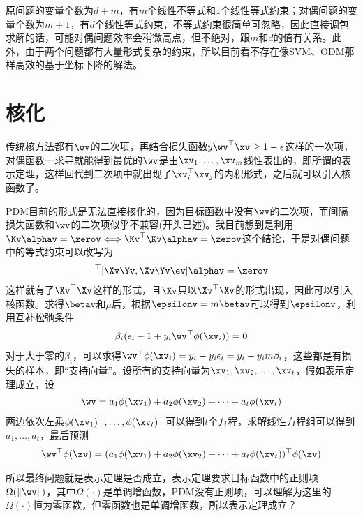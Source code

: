 \documentclass{ctexart}
\begin{document}
原问题的变量个数为$d + m$，有$m$个线性不等式和$1$个线性等式约束；对偶问题的变量个数为$m+1$，有$d$个线性等式约束，不等式约束很简单可忽略，因此直接调包求解的话，可能对偶问题效率会稍微高点，但不绝对，跟$m$和$d$的值有关系。此外，由于两个问题都有大量形式复杂的约束，所以目前看不存在像SVM、ODM那样高效的基于坐标下降的解法。

\section{核化}

传统核方法都有$\wv$的二次项，再结合损失函数$y \wv^\top \xv \ge 1 - \epsilon$这样的一次项，对偶函数一求导就能得到最优的$\wv$是由$\xv_1, \ldots, \xv_m$线性表出的，即所谓的表示定理，这样回代到二次项中就出现了$\xv_i^\top \xv_j$的内积形式，之后就可以引入核函数了。

PDM目前的形式是无法直接核化的，因为目标函数中没有$\wv$的二次项，而间隔损失函数和$\wv$的二次项似乎不兼容(开头已述)。我目前想到是利用$\Kv \alphav = \zerov \Longleftrightarrow \Kv^\top\Kv \alphav = \zerov$这个结论，于是对偶问题中的等式约束可以改写为
\begin{align*}
    [\Xv \Yv, \Xv \Yv \ev]^\top [\Xv \Yv, \Xv \Yv \ev] \alphav = \zerov
\end{align*}
这样就有了$\Xv^\top \Xv$这样的形式，且$\Xv$只以$\Xv^\top \Xv$的形式出现，因此可以引入核函数。求得$\betav$和$\mu$后，根据$\epsilonv = m \betav$可以得到$\epsilonv$，利用互补松弛条件
\begin{align*}
    \beta_i (\epsilon_i - 1 + y_i \wv^\top \phi(\xv_i)) = 0
\end{align*}
对于大于零的$\beta_i$，可以求得$\wv^\top \phi(\xv_i) = y_i - y_i \epsilon_i = y_i - y_i m \beta_i$，这些都是有损失的样本，即“支持向量”。设所有的支持向量为$\xv_1, \xv_2, \ldots, \xv_t$，假如表示定理成立，设
\begin{align} \label{eq: span}
    \wv = a_1 \phi(\xv_1) + a_2 \phi(\xv_2) + \cdots + a_t \phi(\xv_t)
\end{align}
两边依次左乘$\phi(\xv_1)^\top, \ldots, \phi(\xv_t)^\top$可以得到$t$个方程，求解线性方程组可以得到$a_1, \ldots, a_t$，最后预测
\begin{align*}
    \wv^\top \phi(\zv) = (a_1 \phi(\xv_1) + a_2 \phi(\xv_2) + \cdots + a_t \phi(\xv_t))^\top \phi(\zv)
\end{align*}

所以最终问题就是表示定理是否成立，表示定理要求目标函数中的正则项$\Omega(\| \wv \|)$，其中$\Omega(\cdot)$是单调增函数，PDM没有正则项，可以理解为这里的$\Omega(\cdot)$恒为零函数，但零函数也是单调增函数，所以表示定理成立？
\end{document}
